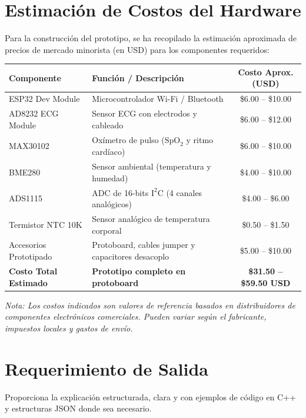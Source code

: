 \documentclass[11pt,a4paper]{article}
\begin{document}
\vspace{0.3cm}

\section*{Estimación de Costos del Hardware}

Para la construcción del prototipo, se ha recopilado la estimación aproximada de precios de mercado minorista (en USD) para los componentes requeridos:

\begin{center}
\small
\begin{tabular}{|l|l|c|}
\hline
\textbf{Componente} & \textbf{Función / Descripción} & \textbf{Costo Aprox. (USD)} \\ \hline
ESP32 Dev Module & Microcontrolador Wi-Fi / Bluetooth & \$6.00 -- \$10.00 \\ \hline
AD8232 ECG Module & Sensor ECG con electrodos y cableado & \$6.00 -- \$12.00 \\ \hline
MAX30102 & Oxímetro de pulso ($\text{SpO}_2$ y ritmo cardíaco) & \$6.00 -- \$10.00 \\ \hline
BME280 & Sensor ambiental (temperatura y humedad) & \$4.00 -- \$10.00 \\ \hline
ADS1115 & ADC de 16-bits $\text{I}^2\text{C}$ (4 canales analógicos) & \$4.00 -- \$6.00 \\ \hline
Termistor NTC 10K & Sensor analógico de temperatura corporal & \$0.50 -- \$1.50 \\ \hline
Accesorios Prototipado & Protoboard, cables jumper y capacitores desacoplo & \$5.00 -- \$10.00 \\ \hline
\hline
\textbf{Costo Total Estimado} & \textbf{Prototipo completo en protoboard} & \textbf{\$31.50 -- \$59.50 USD} \\ \hline
\end{tabular}
\end{center}

\textit{Nota: Los costos indicados son valores de referencia basados en distribuidores de componentes electrónicos comerciales. Pueden variar según el fabricante, impuestos locales y gastos de envío.}

\vspace{0.3cm}

\section*{Requerimiento de Salida}
Proporciona la explicación estructurada, clara y con ejemplos de código en C++ y estructuras JSON donde sea necesario.
\end{document}
